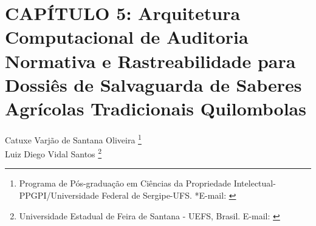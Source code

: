 ﻿\pagestyle{plain}

\chapter{CAPÍTULO 5: Arquitetura Computacional de Auditoria Normativa e Rastreabilidade para Dossiês de Salvaguarda de Saberes Agrícolas Tradicionais Quilombolas}


\begin{flushright}
Catuxe Varjão de Santana Oliveira  \footnote[1]{Programa de Pós-graduação em Ciências da Propriedade Intelectual-PPGPI/Universidade Federal de Sergipe-UFS. *E-mail:  \href{mailto:catuxe@academico.ufs.br}{}}
\\[0.3cm]
Luiz Diego Vidal Santos \footnote[2]{Universidade Estadual de Feira de Santana - UEFS, Brasil. E-mail: \href{mailto:ldvsantos@uefs.br}{}}
\end{flushright}


